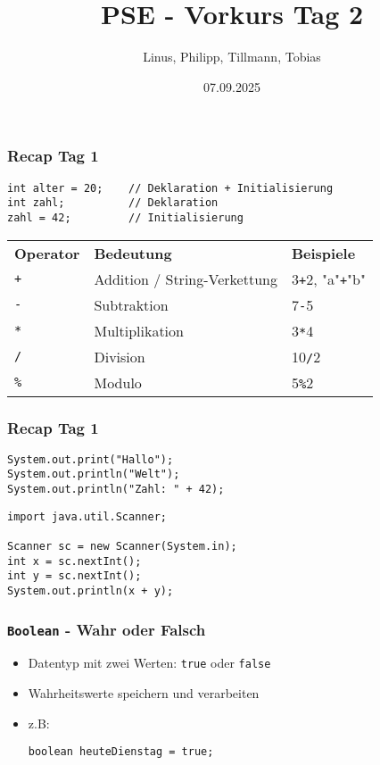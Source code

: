\documentclass{../../presentation}
\title{PSE - Vorkurs Tag 2}
\author{Linus, Philipp, Tillmann, Tobias}
\institute{FIUS - Fachgruppe Informatik Universität Stuttgart}
\date{07.09.2025}
\begin{document}
\begin{frame}
  \titlepage
\end{frame}

\begin{frame}[fragile]
  \frametitle{Recap Tag 1}
  \pause
  \begin{center}
    \begin{verbatim}
int alter = 20;    // Deklaration + Initialisierung
int zahl;          // Deklaration
zahl = 42;         // Initialisierung
    \end{verbatim}

    \pause
    \begin{tabular}{l l l}
      \rowcolor{tablehead}
      \textbf{Operator} & \textbf{Bedeutung}           & \textbf{Beispiele}             \\
      \texttt{+}        & Addition / String-Verkettung & 3\texttt{+}2, "a"\texttt{+}"b" \\
      \texttt{-}        & Subtraktion                  & 7\texttt{-}5                   \\
      \texttt{*}        & Multiplikation               & 3\texttt{*}4                   \\
      \texttt{/}        & Division                     & 10\texttt{/}2                  \\
      \texttt{\%}       & Modulo                       & 5\texttt{\%}2                  \\
    \end{tabular}
  \end{center}
\end{frame}


\begin{frame}[fragile]
  \frametitle{Recap Tag 1}
  \pause
  \begin{verbatim}
System.out.print("Hallo");
System.out.println("Welt");
System.out.println("Zahl: " + 42);
  \end{verbatim}
  \pause
  \begin{verbatim}
import java.util.Scanner;

Scanner sc = new Scanner(System.in);
int x = sc.nextInt();
int y = sc.nextInt();
System.out.println(x + y);
  \end{verbatim}
\end{frame}


\begin{frame}[fragile]
  \frametitle{\texttt{Boolean} - Wahr oder Falsch}
  \pause
  \begin{itemize}
    \item Datentyp mit zwei Werten: \texttt{true} oder \texttt{false}
          \pause
    \item Wahrheitswerte speichern und verarbeiten
          \pause
    \item z.B:
          \begin{verbatim}
boolean heuteDienstag = true;
    \end{verbatim}

  \end{itemize}
\end{frame}
\end{document}
